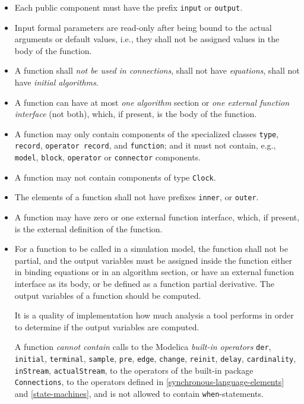 \begin{itemize}
\item
  Each public component must have the prefix \lstinline!input! or \lstinline!output!.
\item
  Input formal parameters are read-only after being bound to the actual arguments or default values, i.e., they shall not be assigned values in the body of the function.
\item
  A function shall \emph{not be used in connections}, shall not have \emph{equations}, shall not have \emph{initial algorithms}.
\item
  A function can have at most \emph{one algorithm} section or \emph{one external function interface} (not both), which, if present, is the body of the function.
\item
  A function may only contain components of the specialized classes \lstinline!type!, \lstinline!record!, \lstinline!operator record!, and \lstinline!function!; and it must not contain, e.g., \lstinline!model!, \lstinline!block!, \lstinline!operator! or \lstinline!connector! components.
\item
  A function may not contain components of type \lstinline!Clock!.
\item
  The elements of a function shall not have prefixes \lstinline!inner!, or \lstinline!outer!.
\item
  A function may have zero or one external function interface, which, if present, is the external definition of the function.
\item
  For a function to be called in a simulation model, the function shall not be partial, and the output variables must be assigned inside the function either in binding equations or in an algorithm section, or have an external function interface as its body, or be defined as a function partial derivative.
  The output variables of a function should be computed.
  \begin{nonnormative}
  It is a quality of implementation how much analysis a tool performs in order to determine if the output variables are computed.
  \end{nonnormative}
  A function \emph{cannot contain} calls to the Modelica \emph{built-in operators} \lstinline!der!, \lstinline!initial!, \lstinline!terminal!, \lstinline!sample!, \lstinline!pre!, \lstinline!edge!, \lstinline!change!, \lstinline!reinit!, \lstinline!delay!, \lstinline!cardinality!, \lstinline!inStream!, \lstinline!actualStream!, to the operators of the built-in package \lstinline!Connections!, to the operators defined in \cref{synchronous-language-elements} and \cref{state-machines}, and is not allowed to contain \lstinline!when!-statements.

\end{itemize}
